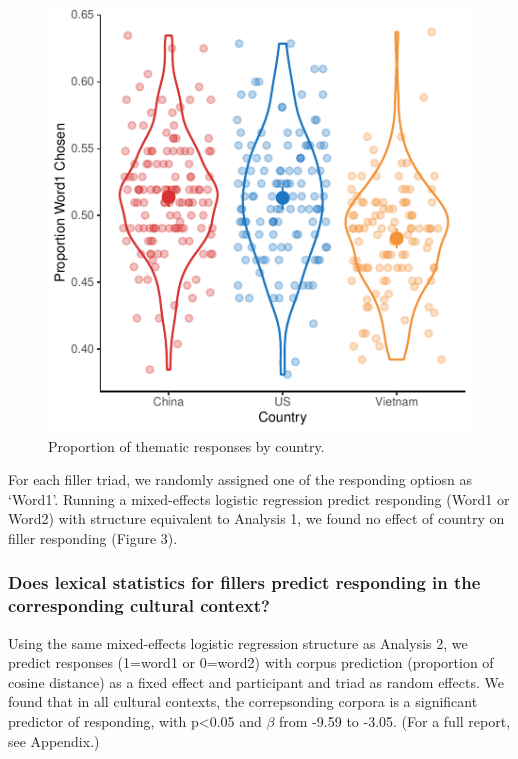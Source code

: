 \documentclass[10pt, letterpaper]{article}
\newenvironment{CodeChunk}{}{}
\begin{document}
\begin{CodeChunk}
\begin{figure}[tb]

{\centering \includegraphics{figs/unnamed-chunk-4-1} 

}

\caption[Proportion of thematic responses by country]{Proportion of thematic responses by country.}\label{fig:unnamed-chunk-4}
\end{figure}
\end{CodeChunk}

For each filler triad, we randomly assigned one of the responding
optiosn as `Word1'. Running a mixed-effects logistic regression predict
responding (Word1 or Word2) with structure equivalent to Analysis 1, we
found no effect of country on filler responding (Figure 3).

\hypertarget{does-lexical-statistics-for-fillers-predict-responding-in-the-corresponding-cultural-context}{%
\subsubsection{Does lexical statistics for fillers predict responding in
the corresponding cultural
context?}\label{does-lexical-statistics-for-fillers-predict-responding-in-the-corresponding-cultural-context}}

Using the same mixed-effects logistic regression structure as Analysis
2, we predict responses (1=word1 or 0=word2) with corpus prediction
(proportion of cosine distance) as a fixed effect and participant and
triad as random effects. We found that in all cultural contexts, the
correpsonding corpora is a significant predictor of responding, with
p\textless0.05 and \(\beta\) from -9.59 to -3.05. (For a full report,
see Appendix.)
\end{document}
